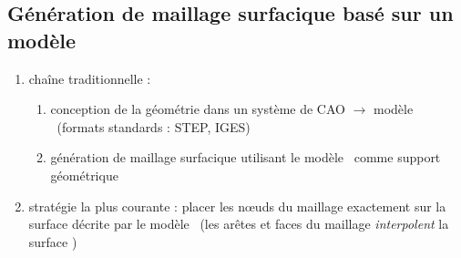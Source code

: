 \subsection{Génération de maillage surfacique basé sur un modèle \brep}

\begin{enumerate}
	\item chaîne traditionnelle :
	\begin{enumerate}
		\item conception de la géométrie dans un système de CAO $\to$ modèle \brep\ (formats standards : STEP, IGES)
		\item génération de maillage surfacique utilisant le modèle \brep\ comme support géométrique 
	\end{enumerate}
	\item stratégie la plus courante : placer les n\oe uds du maillage exactement sur la surface décrite par le modèle \brep\ (les arêtes et faces du maillage \textit{interpolent} la surface \brep)
\end{enumerate}

